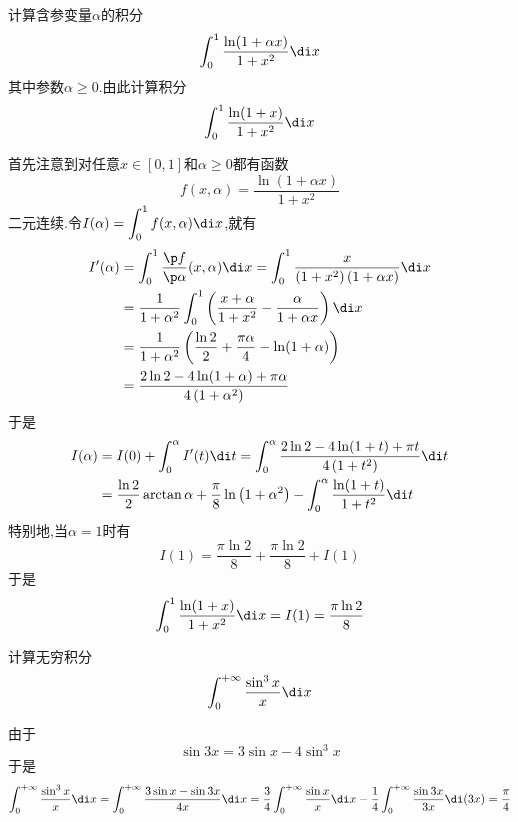 \documentclass{ctexart}
\begin{document}
\pagestyle{empty}
\begin{center}
    \large{}
\end{center}
\begin{problem}[L.13.1]
    计算含参变量$\alpha$的积分
    \[\int_0^1\dfrac{\ln(1+\alpha x)}{1+x^2}\di x\]
    其中参数$\alpha\geqslant0$.由此计算积分
    \[\int_0^1\dfrac{\ln(1+x)}{1+x^2}\di x\]

\end{problem}
\begin{solution}
    首先注意到对任意$x\in[0,1]$和$\alpha\geqslant0$都有函数
    \[f(x,\alpha)=\dfrac{\ln(1+\alpha x)}{1+x^2}\]
    二元连续.令$I(\alpha)=\displaystyle\int_0^1f(x,\alpha)\di x$,就有
    \[\begin{aligned}
        I'(\alpha)
        &= \int_0^1\dfrac{\p f}{\p \alpha}(x,\alpha)\di x=\int_0^1\dfrac{x}{\left(1+x^2\right)\left(1+\alpha x\right)}\di x \\
        &= \dfrac{1}{1+\alpha^2}\int_0^1\left(\dfrac{x+\alpha}{1+x^2}-\dfrac{\alpha}{1+\alpha x}\right)\di x \\
        &= \dfrac{1}{1+\alpha^2}\left(\dfrac{\ln 2}{2}+\dfrac{\pi\alpha}{4}-\ln(1+\alpha)\right) \\
        &= \dfrac{2\ln 2-4\ln(1+\alpha)+\pi\alpha}{4\left(1+\alpha^2\right)}
    \end{aligned}\]
    于是
    \[\begin{aligned}
        I(\alpha)
        &= I(0)+\int_0^{\alpha}I'(t)\di t=\int_0^\alpha\dfrac{2\ln 2-4\ln(1+t)+\pi t}{4\left(1+t^2\right)}\di t \\
        &= \dfrac{\ln 2}{2}\arctan\alpha+\dfrac{\pi}{8}\ln\left(1+\alpha^2\right)-\int_0^{\alpha}\dfrac{\ln(1+t)}{1+t^2}\di t
    \end{aligned}\]
    特别地,当$\alpha=1$时有
    \[I(1)=\dfrac{\pi\ln2}{8}+\dfrac{\pi\ln2}{8}+I(1)\]
    于是
    \[\int_0^1\dfrac{\ln(1+x)}{1+x^2}\di x=I(1)=\dfrac{\pi\ln2}{8}\]

\end{solution}
\begin{problem}[L.13.2]
    计算无穷积分
    \[\int_0^{+\infty}\dfrac{\sin^3x}{x}\di x\]

\end{problem}
\begin{solution}
    由于
    \[\sin 3x=3\sin x-4\sin^3 x\]
    于是
    \[\int_0^{+\infty}\dfrac{\sin^3x}{x}\di x
    =\int_0^{+\infty}\dfrac{3\sin x-\sin 3x}{4x}\di x
    =\dfrac34\int_0^{+\infty}\dfrac{\sin x}{x}\di x-\dfrac14\int_0^{+\infty}\dfrac{\sin 3x}{3x}\di(3x)=\dfrac{\pi}{4}\]

\end{solution}
\end{document}
